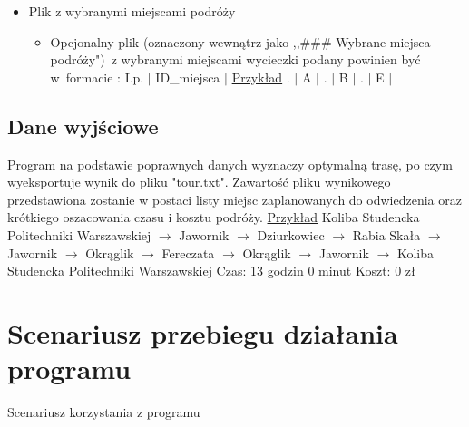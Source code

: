 \documentclass[10pt,oneside]{article}
\begin{document}
\begin{itemize}
	\item Plik z wybranymi miejscami podróży
	\begin{itemize}
		\item Opcjonalny plik (oznaczony wewnątrz jako ,,\#\#\# Wybrane miejsca podróży")~z wybranymi miejscami wycieczki podany powinien być w~formacie : \newline
		Lp. $\vert$ ID\_miejsca $\vert$
		\newline \newline
		\underline{Przykład}
		\newline {}. $\vert$ A $\vert$ . $\vert$ B $\vert$ . $\vert$ E $\vert$ \newline
	\end{itemize}
\end{itemize}

\subsection{Dane wyjściowe}
Program na podstawie poprawnych danych wyznaczy optymalną trasę, po czym wyeksportuje wynik do pliku "tour.txt".
Zawartość pliku wynikowego przedstawiona zostanie w postaci listy miejsc zaplanowanych do odwiedzenia oraz krótkiego oszacowania czasu i kosztu podróży.
\newline \newline
\underline{Przykład}
\newline \newline
Koliba Studencka Politechniki Warszawskiej \newline
$\to$ Jawornik \newline
$\to$ Dziurkowiec \newline
$\to$ Rabia Skała \newline
$\to$ Jawornik \newline
$\to$ Okrąglik \newline
$\to$ Fereczata \newline
$\to$ Okrąglik \newline
$\to$ Jawornik \newline
$\to$ Koliba Studencka Politechniki Warszawskiej \newline
Czas: 13 godzin 0 minut \newline
Koszt: 0 zł \newline


\section{Scenariusz przebiegu działania programu}
Scenariusz korzystania z programu
\end{document}
